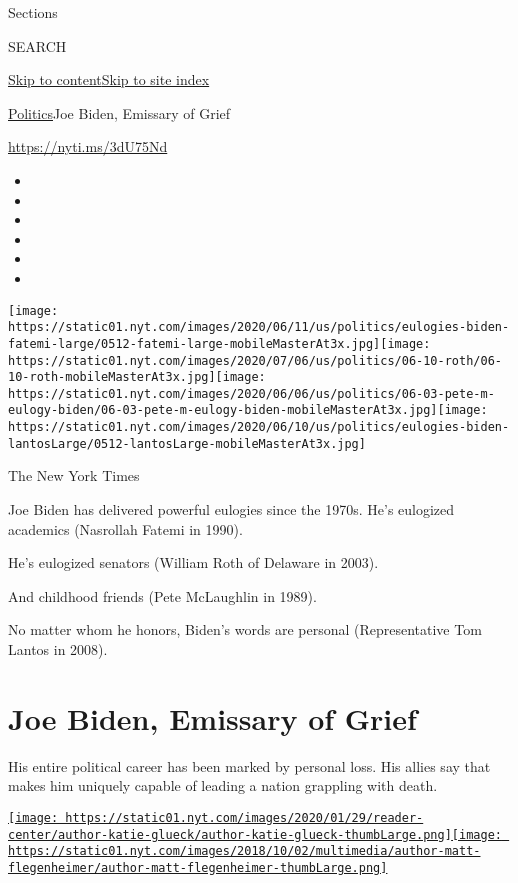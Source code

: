 Sections

SEARCH

\protect\hyperlink{site-content}{Skip to
content}\protect\hyperlink{site-index}{Skip to site index}

\href{/section/politics}{Politics}\textbar{}Joe Biden, Emissary of Grief

\url{https://nyti.ms/3dU75Nd}

\begin{itemize}
\item
\item
\item
\item
\item
\item
\end{itemize}

\texttt{[image: https://static01.nyt.com/images/2020/06/11/us/politics/eulogies-biden-fatemi-large/0512-fatemi-large-mobileMasterAt3x.jpg]}\texttt{[image: https://static01.nyt.com/images/2020/07/06/us/politics/06-10-roth/06-10-roth-mobileMasterAt3x.jpg]}\texttt{[image: https://static01.nyt.com/images/2020/06/06/us/politics/06-03-pete-m-eulogy-biden/06-03-pete-m-eulogy-biden-mobileMasterAt3x.jpg]}\texttt{[image: https://static01.nyt.com/images/2020/06/10/us/politics/eulogies-biden-lantosLarge/0512-lantosLarge-mobileMasterAt3x.jpg]}

The New York Times

Joe Biden has delivered powerful eulogies since the 1970s. He's
eulogized academics (Nasrollah Fatemi in 1990).

He's eulogized senators (William Roth of Delaware in 2003).

And childhood friends (Pete McLaughlin in 1989).

No matter whom he honors, Biden's words are personal (Representative Tom
Lantos in 2008).

\hypertarget{joe-biden-emissary-of-grief}{%
\section{Joe Biden, Emissary of
Grief}\label{joe-biden-emissary-of-grief}}

His entire political career has been marked by personal loss. His allies
say that makes him uniquely capable of leading a nation grappling with
death.

\href{https://www.nytimes.com/by/katie-glueck}{\texttt{[image: https://static01.nyt.com/images/2020/01/29/reader-center/author-katie-glueck/author-katie-glueck-thumbLarge.png]}}\href{https://www.nytimes.com/by/matt-flegenheimer}{\texttt{[image: https://static01.nyt.com/images/2018/10/02/multimedia/author-matt-flegenheimer/author-matt-flegenheimer-thumbLarge.png]}}

